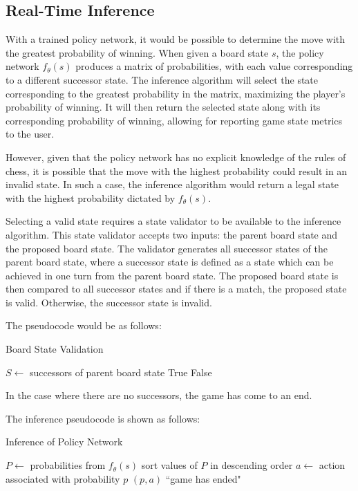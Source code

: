 \documentclass[letterpaper]{article} %
\begin{document}
\subsection{Real-Time Inference}

With a trained policy network, it would be possible to determine the move with the greatest probability of winning. When given a board state $s$, the policy network $f_\theta(s)$ produces a matrix of probabilities, with each value corresponding to a different successor state. The inference algorithm will select the state corresponding to the greatest probability in the matrix, maximizing the player's probability of winning. It will then return the selected state along with its corresponding probability of winning, allowing for reporting game state metrics to the user.

However, given that the policy network has no explicit knowledge of the rules of chess, it is possible that the move with the highest probability could result in an invalid state. In such a case, the inference algorithm would return a legal state with the highest probability dictated by $f_\theta(s)$.

Selecting a valid state requires a state validator to be available to the inference algorithm. This state validator accepts two inputs: the parent board state and the proposed board state. The validator generates all successor states of the parent board state, where a successor state is defined as a state which can be achieved in one turn from the parent board state. The proposed board state is then compared to all successor states and if there is a match, the proposed state is valid. Otherwise, the successor state is invalid.

The pseudocode would be as follows:
\begin{algorithm}[H]
	\caption{Board State Validation}
	\begin{algorithmic}[1]
	    \State $S \gets $ successors of parent board state
	            \State \Return True
	        \EndIf
        \EndFor
        \State \Return False 
	\end{algorithmic}
\end{algorithm}

In the case where there are no successors, the game has come to an end.

The inference pseudocode is shown as follows:
\begin{algorithm}[H]
	\caption{Inference of Policy Network}
	\begin{algorithmic}[1]
    	\State $P \gets$ probabilities from $f_\theta(s)$
        \State sort values of $P$ in descending order 
            \State $a \gets$ action associated with probability $p$
                \State \Return $(p, a)$
            \EndIf
        \EndFor
        \State \Return ``game has ended"
	\end{algorithmic}
\end{algorithm}
\end{document}
